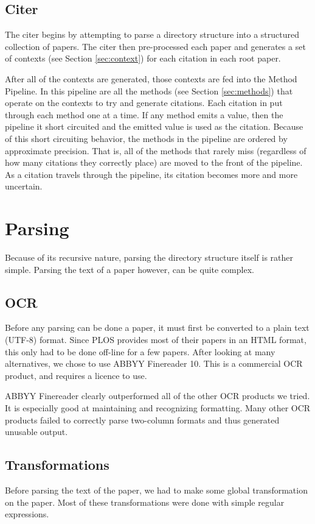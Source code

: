 \documentclass[10pt, conference, compsocconf]{IEEEtran}
\begin{document}
\subsection{Citer}\label{sec:archCiter}
The citer begins by attempting to parse a directory structure into a structured collection of papers.
The citer then pre-processed each paper and generates a set of contexts (see Section \ref{sec:context}) for each citation in each
root paper.

After all of the contexts are generated, those contexts are fed into the Method Pipeline. In this pipeline are all the methods (see Section \ref{sec:methods})
that operate on the contexts to try and generate citations. Each citation in put through each method one at a time. If any method emits a value, then the pipeline
it short circuited and the emitted value is used as the citation. Because of this short circuiting behavior, the methods in the pipeline are ordered by approximate
precision. That is, all of the methods that rarely miss (regardless of how many citations they correctly place) are moved to the front of the pipeline.
As a citation travels through the pipeline, its citation becomes more and more uncertain.

\section{Parsing}\label{sec:parsing}
Because of its recursive nature, parsing the directory structure itself is rather simple.
Parsing the text of a paper however, can be quite complex.

\subsection{OCR}
Before any parsing can be done a paper, it must first be converted to a plain text (UTF-8) format.
Since PLOS provides most of their papers in an HTML format, this only had to be done off-line for a few
papers. After looking at many alternatives, we chose to use ABBYY Finereader 10\cite{abbyy}. This
is a commercial OCR product, and requires a licence to use.

ABBYY Finereader clearly outperformed all of the other OCR products we tried. It is especially
good at maintaining and recognizing formatting. Many other OCR products failed to correctly parse
two-column formats and thus generated unusable output.

\subsection{Transformations}\label{sec:transforms}
Before parsing the text of the paper, we had to make some global transformation on the paper.
Most of these transformations were done with simple regular expressions.
\end{document}
